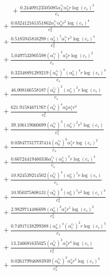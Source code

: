 \documentclass[10pt]{article}
\begin{document}
\begin{align*}
\phantom{R_{3,9}} &\phantom{={}}{}  + \frac{0.24409123505085 \alpha_{3}^{c_s} \alpha_{3}^s r \log{\left(c_{s} \right)}^{3}}{c_{s}} \\
&{}  + \frac{0.032412161351862 \alpha_{1}^{c_s} \alpha_{4}^s r^{2} \log{\left(c_{s} \right)}^{4}}{c_{s}^{2}} \\
&{}  + \frac{0.5185945816298 \left(\alpha_{0}^s\right)^{5} \alpha_{1}^{c_s} r^{2} \log{\left(c_{s} \right)}^{4}}{c_{s}^{2}} \\
&{}  + \frac{5.0497533905598 \left(\alpha_{1}^{c_s}\right)^{2} \alpha_{3}^s r \log{\left(c_{s} \right)}^{2}}{c_{s}} \\
&{}  + \frac{0.32348891289219 \left(\alpha_{0}^{c_s}\right)^{4} \left(\alpha_{0}^s\right)^{4} r \log{\left(c_{s} \right)}^{3}}{c_{s}} \\
&{}  + \frac{46.008166558187 \left(\alpha_{0}^{c_s}\right)^{2} \left(\alpha_{2}^s\right)^{2} r \log{\left(c_{s} \right)}}{c_{s}} \\
&{}  + \frac{621.91584671767 \left(\alpha_{0}^{c_s}\right)^{4} \alpha_{0}^s \alpha_{1}^s r^{2}}{c_{s}^{2}} \\
&{}  + \frac{39.106119060699 \left(\alpha_{0}^{c_s}\right)^{2} \left(\alpha_{0}^s\right)^{2} r^{5} \log{\left(c_{s} \right)}}{c_{s}^{5}} \\
&{}  + \frac{0.038477317737414 \left(\alpha_{0}^{c_s}\right)^{6} \alpha_{1}^s r \log{\left(c_{s} \right)}^{2}}{c_{s}} \\
&{}  + \frac{0.66724419460336 \alpha_{1}^{c_s} \left(\alpha_{2}^s\right)^{2} r \log{\left(c_{s} \right)}^{4}}{c_{s}} \\
&{}  + \frac{10.824539214502 \left(\alpha_{0}^{c_s}\right)^{3} \left(\alpha_{0}^s\right)^{5} r \log{\left(c_{s} \right)}}{c_{s}} \\
&{}  + \frac{10.950375808131 \left(\alpha_{0}^{c_s}\right)^{2} \left(\alpha_{0}^s\right)^{5} r^{2} \log{\left(c_{s} \right)}^{3}}{c_{s}^{2}} \\
&{}  + \frac{2.9829714486698 \left(\alpha_{0}^s\right)^{2} \alpha_{1}^s r^{5} \log{\left(c_{s} \right)}^{2}}{c_{s}^{5}} \\
&{}  + \frac{0.74917138299388 \left(\alpha_{0}^s\right)^{4} \left(\alpha_{1}^{c_s}\right)^{2} r \log{\left(c_{s} \right)}^{3}}{c_{s}} \\
&{}  + \frac{13.246681635025 \left(\alpha_{0}^{c_s}\right)^{2} \alpha_{2}^s r^{4} \log{\left(c_{s} \right)}}{c_{s}^{4}} \\
&{}  + \frac{0.026179946883939 \left(\alpha_{0}^{c_s}\right)^{2} \alpha_{3}^s r^{3} \log{\left(c_{s} \right)}^{4}}{c_{s}^{3}} \\

\end{align*}
\end{document}
